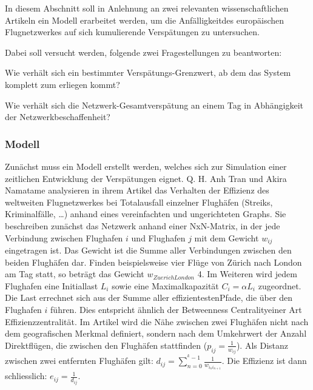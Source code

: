 In diesem Abschnitt soll in Anlehnung an zwei relevanten wissenschaftlichen Artikeln ein Modell erarbeitet werden,
um die \guillemotleft Anfälligkeit\guillemotright des europäischen Flugnetzwerkes auf sich kumulierende Verspätungen zu untersuchen.

Dabei soll versucht werden, folgende zwei Fragestellungen zu beantworten:

\begin{enumeration}
    \item Wie verhält sich ein bestimmter Verspätungs-Grenzwert, ab dem das System komplett zum erliegen kommt?
    \item Wie verhält sich die Netzwerk-Gesamtverspätung an einem Tag in Abhängigkeit der Netzwerkbeschaffenheit?
\end{enumeration}

\subsubsection{Modell}
\label{subsubsec:model}

Zunächst muss ein Modell erstellt werden, welches sich zur Simulation einer zeitlichen Entwicklung der Verspätungen eignet.
Q. H. Anh Tran und Akira Namatame \cite{anh-tran-worldwide-aviation-network} analysieren in ihrem Artikel das Verhalten
der Effizienz des weltweiten Flugnetzwerkes bei Totalausfall einzelner Flughäfen (Streiks, Kriminalfälle, …) anhand eines vereinfachten und ungerichteten Graphs.
Sie beschreiben zunächst das Netzwerk anhand einer NxN-Matrix, in der jede Verbindung zwischen Flughafen $ i $ und Flughafen $ j $
mit dem Gewicht $ w_{ij} $ eingetragen ist.
Das Gewicht ist die Summe aller Verbindungen zwischen den beiden Flughäfen dar.
Finden beispielsweise vier Flüge von Zürich nach London am Tag statt, so beträgt das Gewicht $ w_{Zuerich London}$ 4.
Im Weiteren wird jedem Flughafen eine Initiallast $L_{i}$ sowie eine Maximalkapazität $ C_{i} = \alpha L_{i}$ zugeordnet.
Die Last errechnet sich aus der Summe aller \guillemotleft effizientesten\guillemotright Pfade, die über den Flughafen $i$ führen.
Dies entspricht ähnlich der \guillemotleft Betweenness Centrality\guillemotright einer Art \guillemotleft Effizienzzentralität\guillemotright.
Im Artikel wird die Nähe zwischen zwei Flughäfen nicht nach dem geografischen Merkmal definiert, sondern nach dem Umkehrwert der Anzahl Direktflügen,
die zwischen den Flughäfen stattfinden ($ p_{ij} = \frac{1}{w_{ij}} $).
Als Distanz zwischen zwei entfernten Flughäfen gilt: $ d_{ij} = \sum_{n=0}^{^k-1}\frac{1}{w_{i_{n}i_{n + 1}}}$.
Die Effizienz ist dann schliesslich: $ e_{ij} = \frac{1}{d_{ij}}$.

